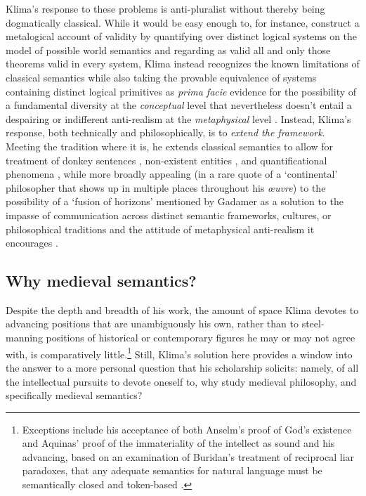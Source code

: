 \documentclass[]{article}
\begin{document}
Klima's response to these problems is anti-pluralist 
without thereby being dogmatically classical. 
While it would be easy enough to, for instance, 
construct a metalogical account of validity by quantifying over distinct logical systems on the model of possible world semantics and regarding as valid all and only those theorems valid in every system, 
Klima instead recognizes the known limitations of classical semantics 
while also taking the provable equivalence of systems containing distinct logical primitives
as \emph{prima facie} evidence for the possibility of a fundamental diversity at the \emph{conceptual} level 
that nevertheless doesn't entail a despairing or indifferent anti-realism at the \emph{metaphysical} level \autocite{Klima2012}.
Instead, 
Klima's response, 
both technically and philosophically, 
is to \emph{extend the framework}. 
Meeting the tradition where it is, he extends classical semantics to allow for treatment of 
donkey sentences \autocite{Klima1988,Klima2010}, 
non-existent entities \autocite{Klima2001}, 
and quantificational phenomena \autocite{KlimaSandu1990},
while more broadly appealing (in a rare quote of a `continental' philosopher that shows up in multiple places throughout his \emph{\oe{}uvre}) 
to the possibility of a `fusion of horizons' mentioned by Gadamer 
as a solution to the impasse of communication across distinct semantic frameworks, cultures, or philosophical traditions 
and the attitude of metaphysical anti-realism it encourages \autocite{Klima2000,Klima2009a}.

\subsection{Why medieval semantics?}
Despite the depth and breadth of his work, 
the amount of space Klima devotes to advancing positions that are unambiguously his own, 
rather than to steel-manning positions of historical or contemporary figures 
he may or may not agree with,
is comparatively little.\footnote{Exceptions include his acceptance of both Anselm's proof of God's existence and Aquinas' proof of the immateriality of the intellect as sound \autocite{Klima2000,Klima2009a} 
	and his advancing, 
	based on an examination of Buridan's treatment of reciprocal liar paradoxes, 
	that any adequate semantics for natural language must be semantically closed and token-based \autocite{Klima2004,Klima2008}.} 
Still, 
Klima's solution here provides a window into the answer to a more personal question that his scholarship solicits: 
namely, 
of all the intellectual pursuits to devote oneself to, 
why study medieval philosophy, 
and specifically medieval semantics?
\end{document}
